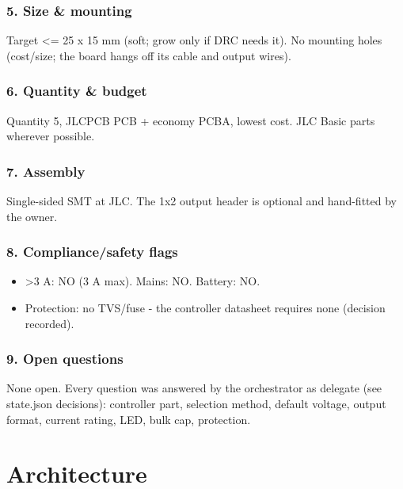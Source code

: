 \documentclass[11pt,a4paper]{article}
\begin{document}
\subsubsection*{5. Size \& mounting}
Target \textless{}= 25 x 15 mm (soft; grow only if DRC needs it). No mounting holes (cost/size; the board hangs off its cable and output wires).

\subsubsection*{6. Quantity \& budget}
Quantity 5, JLCPCB PCB + economy PCBA, lowest cost. JLC Basic parts wherever possible.

\subsubsection*{7. Assembly}
Single-sided SMT at JLC. The 1x2 output header is optional and hand-fitted by the owner.

\subsubsection*{8. Compliance/safety flags}
\begin{itemize}
\item \textgreater{}3 A: NO (3 A max). Mains: NO. Battery: NO.
\item Protection: no TVS/fuse - the controller datasheet requires none (decision recorded).
\end{itemize}
\subsubsection*{9. Open questions}
None open. Every question was answered by the orchestrator as delegate (see state.json decisions): controller part, selection method, default voltage, output format, current rating, LED, bulk cap, protection.

\section{Architecture}
\end{document}
